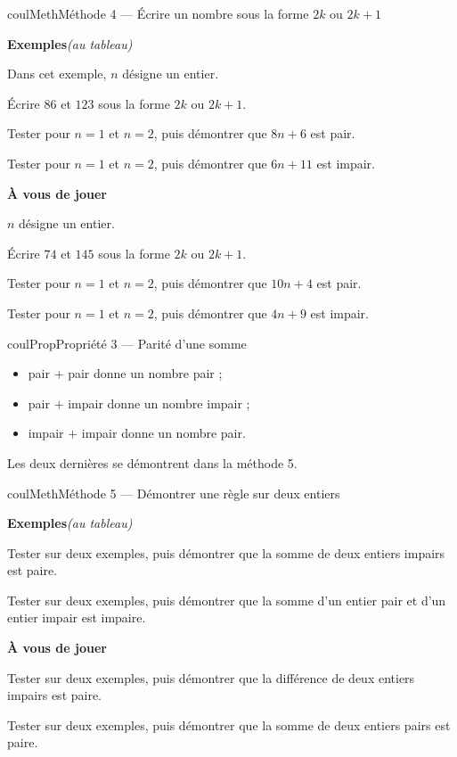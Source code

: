\documentclass[11pt,a4paper]{article}
\makeatletter
\newcounter{lycee@signet}
\newcommand{\signet}[3][]{\stepcounter{lycee@signet}%
  \edef\lycee@dest{\if\relax\detokenize{#1}\relax
    signet.\arabic{lycee@signet}\else#1\fi}%
  \hypertarget{\lycee@dest}{}\bookmark[level=#2,dest=\lycee@dest]{#3}}
\newcounter{methode}
\newenvironment{proprietebox}[1][Propriété]%
  {\begin{boitecours}[phantom={\signet{2}{#1}}]{coulProp}{#1}}{\end{boitecours}}
\newenvironment{methodebox}[1][Méthode]{\stepcounter{methode}%
  \begin{boitecours}[phantom={\signet[methode-\arabic{methode}]{2}{#1}}]{coulMeth}{#1}}%
  {\end{boitecours}}
\newcommand{\etape}[1]{\par\smallskip\textbf{\color{coulMeth}#1}\par\nobreak\smallskip}
\newcommand{\autableau}{\hfill{\footnotesize\itshape\color{black!45}(au tableau)}}
\newcommand{\etapeexemples}{%
    \par\smallskip\textbf{\color{coulMeth}Exemples}\autableau\par\nobreak\smallskip}
\makeatother
\begin{document}
\begin{methodebox}[Méthode 4 --- Écrire un nombre sous la forme $2k$ ou $2k+1$]
\etapeexemples
Dans cet exemple, $n$ désigne un entier.
\begin{questions}[label=\alph*)]
  \item Écrire $86$ et $123$ sous la forme $2k$ ou $2k+1$.
  \item Tester pour $n=1$ et $n=2$, puis démontrer que $8n+6$ est pair.
  \item Tester pour $n=1$ et $n=2$, puis démontrer que $6n+11$ est impair.
\end{questions}

\etape{À vous de jouer}
$n$ désigne un entier.
\begin{questions}[label=\alph*)]
  \item Écrire $74$ et $145$ sous la forme $2k$ ou $2k+1$.
  \item Tester pour $n=1$ et $n=2$, puis démontrer que $10n+4$ est pair.
  \item Tester pour $n=1$ et $n=2$, puis démontrer que $4n+9$ est impair.
\end{questions}

\end{methodebox}

\begin{proprietebox}[Propriété 3 --- Parité d'une somme]
\begin{itemize}
  \item pair $+$ pair donne un nombre pair ;
  \item pair $+$ impair donne un nombre impair ;
  \item impair $+$ impair donne un nombre pair.
\end{itemize}
Les deux dernières se démontrent dans la méthode 5.
\end{proprietebox}

\begin{methodebox}[Méthode 5 --- Démontrer une règle sur deux entiers]
\etapeexemples
\begin{questions}[label=\alph*)]
  \item Tester sur deux exemples, puis démontrer que la somme de deux entiers impairs
    est paire.
  \item Tester sur deux exemples, puis démontrer que la somme d'un entier pair et d'un
    entier impair est impaire.
\end{questions}

\etape{À vous de jouer}
\begin{questions}[label=\alph*)]
  \item Tester sur deux exemples, puis démontrer que la différence de deux entiers
    impairs est paire.
  \item Tester sur deux exemples, puis démontrer que la somme de deux entiers pairs est
    paire.
\end{questions}

\end{methodebox}
\end{document}
